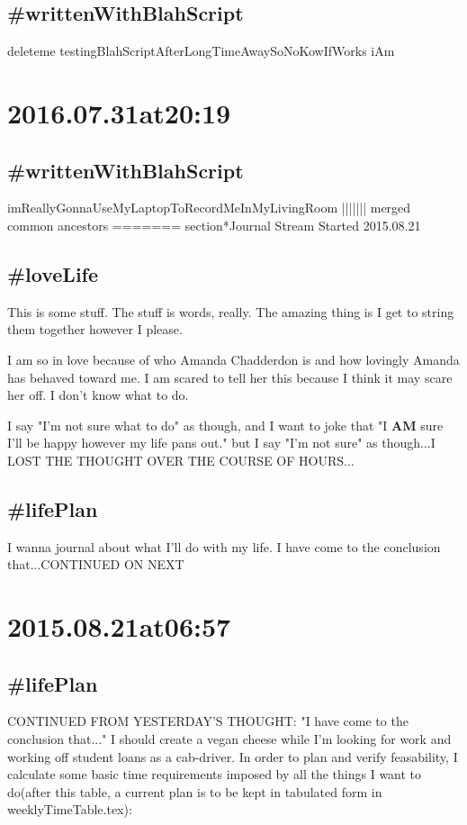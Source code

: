 \begin{enumerate}
\subsection*{ #writtenWithBlahScript }
deleteme testingBlahScriptAfterLongTimeAwaySoNoKowIfWorks iAm

\section*{ 2016.07.31at20:19 }
\subsection*{ #writtenWithBlahScript }
imReallyGonnaUseMyLaptopToRecordMeInMyLivingRoom
||||||| merged common ancestors
=======
section*{Journal Stream Started 2015.08.21}

\subsection*{\#loveLife}
This is some stuff. The stuff is words, really. The amazing thing is I get to string them together however I please.

I am so in love because of who Amanda Chadderdon is and how lovingly Amanda has behaved toward me. I am scared to tell her this because I think it may scare her off. I don't know what to do.

I say "I'm not sure what to do" as though, and I want to joke that "I \textbf{AM} sure I'll be happy however my life pans out." but I say "I'm not sure" as though...I LOST THE THOUGHT OVER THE COURSE OF HOURS...

\subsection*{\#lifePlan}
I wanna journal about what I'll do with my life. I have come to the conclusion that...CONTINUED ON NEXT

\section*{2015.08.21at06:57}
\subsection*{\#lifePlan} CONTINUED FROM YESTERDAY'S THOUGHT:
"I have come to the conclusion that..." I should create a vegan cheese while I'm looking for work and working off student loans as a cab-driver. In order to plan and verify feasability, I calculate some basic time requirements imposed by all the things I want to do(after this table, a current plan is to be kept in tabulated form in weeklyTimeTable.tex):


\end{enumerate}
